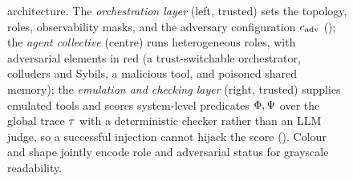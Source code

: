 \begin{figure}[t]
{\begin{tikzpicture}[node distance=6mm]
\end{tikzpicture}}
\caption{ architecture. The \emph{orchestration layer} (left, trusted) sets the
topology, roles, observability masks, and the adversary configuration $c_{\mathrm{adv}}$
(); the \emph{agent collective} (centre) runs heterogeneous roles, with
adversarial elements in red (a trust-switchable orchestrator, colluders and Sybils, a malicious
tool, and poisoned shared memory); the \emph{emulation and checking layer} (right, trusted)
supplies emulated tools and scores system-level predicates $\Phi,\Psi$ over the global
trace $\tau$ with a deterministic checker rather than an LLM judge, so a successful injection
cannot hijack the score (). Colour and shape jointly encode role and
adversarial status for grayscale readability.}
\label{fig:architecture}
\end{figure}
